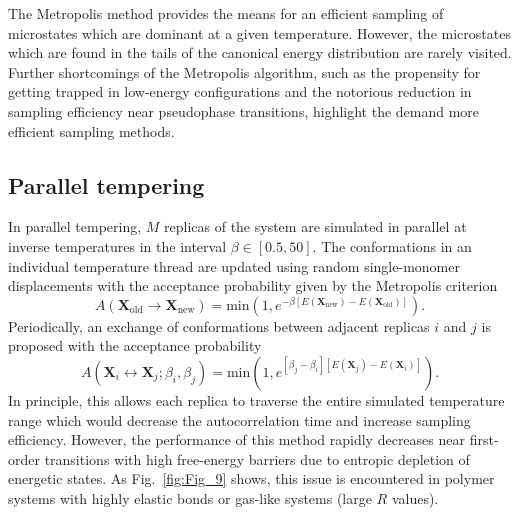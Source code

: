 \documentclass[12pt]{report}
\begin{document}
The Metropolis method provides the means for an efficient sampling of microstates which are dominant at a given temperature. However, the microstates which are found in the tails of the canonical energy distribution are rarely visited. Further shortcomings of the Metropolis algorithm, such as the propensity for getting trapped in low-energy configurations and the notorious reduction in sampling efficiency near pseudophase transitions, highlight the demand more efficient sampling methods.


\subsection{Parallel tempering}
In parallel tempering, $M$ replicas of the system are simulated in parallel
at inverse temperatures in the interval 
$\beta \in \left[0.5,50\right]$. The conformations in an individual
temperature thread are updated using random single-monomer displacements
with the acceptance probability given by the Metropolis criterion
\begin{equation}
A\left(\mathbf{X}_{\mathrm{old}} \rightarrow
\mathbf{X}_{\mathrm{new}}\right) = 			
\mathrm{min}\left(1,e^{ -\beta\left[E (\mathbf{X}_{\mathrm{new}}) - 	
E(\mathbf{X}_{\mathrm{old}})\right]} \right).
\end{equation}
Periodically, an exchange of conformations between adjacent replicas $i$
and $j$ is proposed with the acceptance probability
\begin{equation}
A\left(\mathbf{X}_{i} \leftrightarrow \mathbf{X}_{j};
\beta _{i}, \beta_{j} \right) = \mathrm{min}\left(1,e^{\left[\beta_{j} -
\beta _{i} \right] \left[E (\mathbf{X}_{j}) -
E(\mathbf{X}_{i})\right]} \right).
\end{equation}
In principle, this allows each replica to traverse the entire simulated
temperature range which would decrease the autocorrelation time
and increase sampling efficiency. However, the performance of this method
rapidly decreases near first-order transitions with high free-energy
barriers due to entropic depletion of energetic states. As
Fig.~\ref{fig:Fig_9} shows, this issue is encountered in polymer systems
with highly elastic bonds or gas-like systems (large $R$ values).
\end{document}
